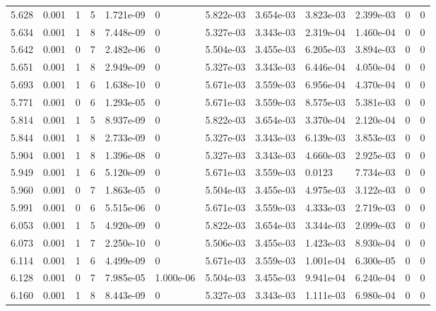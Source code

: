 \documentclass[preview]{standalone}
\begin{document}
{{{{{\begin{tabular}{L{1.2cm}C{1.2cm} C{0.3cm}C{0.5cm} C{1.4cm}C{1.4cm} C{1.4cm}C{1.4cm} C{1.6cm}C{1.6cm} C{1.6cm}C{1.6cm}}
  5.628  &  0.001  & 1     &  5 &  1.721e-09  & 0  &  5.822e-03&   3.654e-03& 3.823e-03 & 2.399e-03   &  0 & 0  \\ 
  5.634  &  0.001  & 1     &  8 &  7.448e-09  & 0  &  5.327e-03&   3.343e-03& 2.319e-04 & 1.460e-04   &  0 & 0  \\ 
  5.642  &  0.001  & 0     &  7 &  2.482e-06  & 0  &  5.504e-03&   3.455e-03& 6.205e-03 & 3.894e-03   &  0 & 0  \\ 
  5.651  &  0.001  & 1     &  8 &  2.949e-09  & 0  &  5.327e-03&   3.343e-03& 6.446e-04 & 4.050e-04   &  0 & 0  \\ 
  5.693  &  0.001  & 1     &  6 &  1.638e-10  & 0  &  5.671e-03&   3.559e-03& 6.956e-04 & 4.370e-04   &  0 & 0  \\ 
  5.771  &  0.001  & 0     &  6 &  1.293e-05  & 0  &  5.671e-03&   3.559e-03& 8.575e-03 & 5.381e-03   &  0 & 0  \\ 
  5.814  &  0.001  & 1     &  5 &  8.937e-09  & 0  &  5.822e-03&   3.654e-03& 3.370e-04 & 2.120e-04   &  0 & 0  \\ 
  5.844  &  0.001  & 1     &  8 &  2.733e-09  & 0  &  5.327e-03&   3.343e-03& 6.139e-03 & 3.853e-03   &  0 & 0  \\ 
  5.904  &  0.001  & 1     &  8 &  1.396e-08  & 0  &  5.327e-03&   3.343e-03& 4.660e-03 & 2.925e-03   &  0 & 0  \\ 
  5.949  &  0.001  & 1     &  6 &  5.120e-09  & 0  &  5.671e-03&   3.559e-03& 0.0123 & 7.734e-03   &  0 & 0  \\ 
  5.960  &  0.001  & 0     &  7 &  1.863e-05  & 0  &  5.504e-03&   3.455e-03& 4.975e-03 & 3.122e-03   &  0 & 0  \\ 
  5.991  &  0.001  & 0     &  6 &  5.515e-06  & 0  &  5.671e-03&   3.559e-03& 4.333e-03 & 2.719e-03   &  0 & 0  \\ 
  6.053  &  0.001  & 1     &  5 &  4.920e-09  & 0  &  5.822e-03&   3.654e-03& 3.344e-03 & 2.099e-03   &  0 & 0  \\ 
  6.073  &  0.001  & 1     &  7 &  2.250e-10  & 0  &  5.506e-03&   3.455e-03& 1.423e-03 & 8.930e-04   &  0 & 0  \\ 
  6.114  &  0.001  & 1     &  6 &  4.499e-09  & 0  &  5.671e-03&   3.559e-03& 1.001e-04 & 6.300e-05   &  0 & 0  \\ 
  6.128  &  0.001  & 0     &  7 &  7.985e-05  & 1.000e-06  &  5.504e-03&   3.455e-03& 9.941e-04 & 6.240e-04   &  0 & 0  \\ 
  6.160  &  0.001  & 1     &  8 &  8.443e-09  & 0  &  5.327e-03&   3.343e-03& 1.111e-03 & 6.980e-04   &  0 & 0  \\ 

\end{tabular}}}}}}
\end{document}
